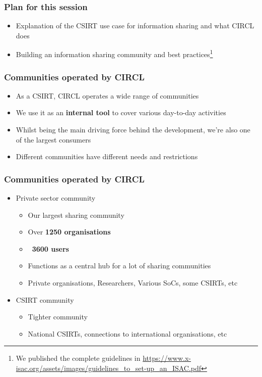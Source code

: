
\begin{frame}[t,plain]
\titlepage
\end{frame}

\begin{frame}
	\frametitle{Plan for this session}
	\begin{itemize}
		\item Explanation of the CSIRT use case for information sharing and what CIRCL does
        \item Building an information sharing community and best practices\footnote{We published the complete guidelines in \url{https://www.x-isac.org/assets/images/guidelines_to_set-up_an_ISAC.pdf}}
	\end{itemize}
\end{frame}

\begin{frame}
\frametitle{Communities operated by CIRCL}
\begin{itemize}
        \item As a CSIRT, CIRCL operates a wide range of communities
        \item We use it as an {\bf internal tool} to cover various day-to-day activities
        \item Whilst being the main driving force behind the development, we're also one of the largest consumers
	\item Different communities have different needs and restrictions
\end{itemize}
\end{frame}

\begin{frame}
\frametitle{Communities operated by CIRCL}
\begin{itemize}
        \item Private sector community
	\begin{itemize}
		\item Our largest sharing community
		\item Over {\bf 1250 organisations}
		\item {\bf ~3600 users}
		\item Functions as a central hub for a lot of sharing communities
		\item Private organisations, Researchers, Various SoCs, some CSIRTs, etc
	\end{itemize}
	\item CSIRT community
	\begin{itemize}
		\item Tighter community
		\item National CSIRTs, connections to international organisations, etc
	\end{itemize}
\end{itemize}
\end{frame}

